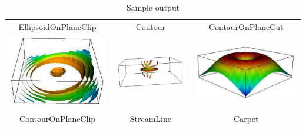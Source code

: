 \begin{table}[h]
\begin{tabular}{c c c}
EllipsoidOnPlaneClip & Contour & ContourOnPlaneCut \\
\includegraphics[width=\thumbnailwidth]{figures/ContourOnPlaneClip} & 
\includegraphics[width=\thumbnailwidth]{figures/StreamLine} & 
\includegraphics[width=\thumbnailwidth]{figures/Carpet}  \\
ContourOnPlaneClip & StreamLine & Carpet \\
\end{tabular}
\caption{Sample output}
\end{table}



